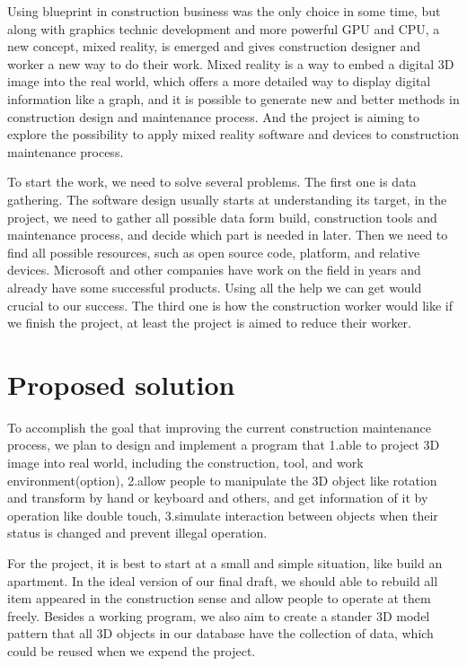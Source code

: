 \documentclass[10pt,letter paper]{article}
\begin{document}
    Using blueprint in construction business was the only choice in some time, but along with graphics technic development and more powerful GPU and CPU, a new concept, mixed reality, is emerged and gives construction designer and worker a new way to do their work. Mixed reality is a way to embed a digital 3D image into the real world, which offers a more detailed way to display digital information like a graph, and it is possible to generate new and better methods in construction design and maintenance process. And the project is aiming to explore the possibility to apply mixed reality software and devices to construction maintenance process.\newline \par

    To start the work, we need to solve several problems. The first one is data gathering. The software design usually starts at understanding its target, in the project, we need to gather all possible data form build, construction tools and maintenance process, and decide which part is needed in later. Then we need to find all possible resources, such as open source code, platform, and relative devices. Microsoft and other companies have work on the field in years and already have some successful products. Using all the help we can get would crucial to our success. The third one is how the construction worker would like if we finish the project, at least the project is aimed to reduce their worker.\newline \par


\section*{Proposed solution }
    \bigskip
    To accomplish the goal that improving the current construction maintenance process, we plan to design and implement a program that 1.able to project 3D image into real world, including the construction, tool, and work environment(option), 2.allow people to manipulate the 3D object like rotation and transform by hand or keyboard and others, and get information of it by operation like double touch, 3.simulate interaction between objects when their status is changed and prevent illegal operation.\newline \par

    For the project, it is best to start at a small and simple situation, like build an apartment. In the ideal version of our final draft, we should able to rebuild all item appeared in the construction sense and allow people to operate at them freely. Besides a working program, we also aim to create a stander 3D model pattern that all 3D objects in our database have the collection of data, which could be reused when we expend the project.\newline \par
\end{document}
